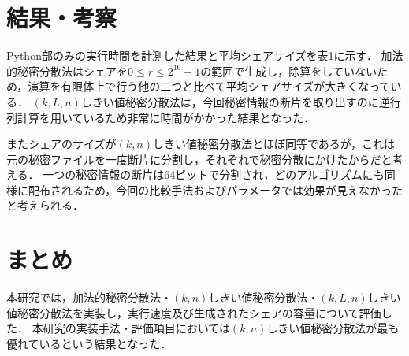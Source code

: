 \documentclass[twocolumn]{jarticle}
\begin{document}
\section{結果・考察}
Python部のみの実行時間を計測した結果と平均シェアサイズを表1に示す．
%
加法的秘密分散法はシェアを$0{\leq}r{\leq}2^{16}-1$の範囲で生成し，除算をしていないため，演算を有限体上で行う他の二つと比べて平均シェアサイズが大きくなっている．
%
$(k,L,n)$しきい値秘密分散法は，今回秘密情報の断片を取り出すのに逆行列計算を用いているため非常に時間がかかった結果となった．

またシェアのサイズが$(k,n)$しきい値秘密分散法とほぼ同等であるが，これは元の秘密ファイルを一度断片に分割し，それぞれで秘密分散にかけたからだと考える．
%
一つの秘密情報の断片は64ビットで分割され，どのアルゴリズムにも同様に配布されるため，今回の比較手法およびパラメータでは効果が見えなかったと考えられる．
%
\begin{table}[ht]
	\begin{center}
		\caption{実行時間及びシェアの平均サイズ．}
		\vspace{-4mm}
		\label{table:result}
	\end{center}
\end{table}
\vspace{-6mm}

\section{まとめ}
本研究では，加法的秘密分散法・$(k,n)$しきい値秘密分散法・$(k,L,n)$しきい値秘密分散法を実装し，実行速度及び生成されたシェアの容量について評価した．
%
本研究の実装手法・評価項目においては$(k,n)$しきい値秘密分散法が最も優れているという結果となった．
\end{document}

